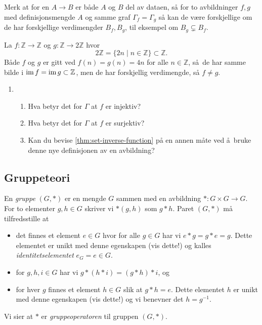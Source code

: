 \begin{remark}
    Merk at for en $A\to B$ er både $A$ og $B$ del av
    dataen, så for to avbildninger $f, g$ med definisjonsmengde
    $A$ og samme graf $\Gamma_f = \Gamma_g$ så kan de være forskjellige
    om de har forskjellige verdimengder $B_f, B_g$,
    til eksempel om $B_g\subsetneq B_f$.
\end{remark}
\begin{example}
    La $f\colon \mathbb Z\to \mathbb Z$ og
    $g\colon \mathbb Z\to 2\mathbb Z$
    hvor
    \[
        2\mathbb Z = \{2n \mid n\in \mathbb Z\}\subset \mathbb Z.
    \]
    Både $f$ og $g$ er gitt ved $f(n) = g(n) = 4n$ for alle $n\in \mathbb Z$,
    så de har samme bilde i $\operatorname{im} f = \operatorname{im} g\subset\mathbb Z$,
    men de har forskjellig verdimengde, så $f\neq g$.
\end{example}
\begin{enumerate}[resume]
    \item
        \begin{enumerate}
            \item Hva betyr det for $\Gamma$ at $f$ er injektiv?
            \item Hva betyr det for $\Gamma$ at $f$ er surjektiv?
            \item Kan du bevise \cref{thm:set-inverse-function} på en annen
                måte ved å bruke denne nye definisjonen av en avbildning?
        \end{enumerate}
\end{enumerate}

\subsection{Gruppeteori}

\begin{definition}
    En \textit{gruppe} $(G,\ast)$ er en mengde $G$ sammen med en avbildning
    $\ast\colon G\times G\to G$.
    For to elementer $g, h\in G$ skriver vi $\ast(g,h)$ som $g\ast h$.
    Paret $(G, \ast)$ må tilfredsstille at
    \begin{itemize}
        \item det finnes et element $e\in G$ hvor for alle $g\in G$
            har vi $e\ast g = g\ast e = g$.
            Dette elementet er unikt med denne egenskapen (vis dette!)
            og kalles \textit{identitetselementet} $e_G = e \in G$.
        \item for $g, h, i\in G$ har vi
            $g\ast (h\ast i) = (g\ast h)\ast i$, og
        \item for hver $g$ finnes et element $h\in G$
            slik at $g \ast h = e$.
            Dette elementet $h$ er unikt med denne egenskapen (vis dette!)
            og vi benevner det $h = g^{-1}$.
    \end{itemize}
    Vi sier at $\ast$ er \textit{gruppeoperatoren} til gruppen $(G,\ast)$.
\end{definition}

